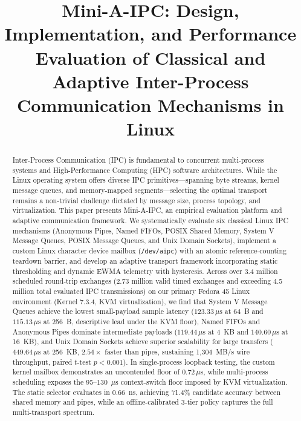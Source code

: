 \documentclass[conference]{IEEEtran}
\begin{document}
\title{Mini-A-IPC: Design, Implementation, and Performance Evaluation of Classical and Adaptive Inter-Process Communication Mechanisms in Linux}

\author{
}

\maketitle

\begin{abstract}
Inter-Process Communication (IPC) is fundamental to concurrent multi-process systems and High-Performance Computing (HPC) software architectures. While the Linux operating system offers diverse IPC primitives---spanning byte streams, kernel message queues, and memory-mapped segments---selecting the optimal transport remains a non-trivial challenge dictated by message size, process topology, and virtualization. This paper presents Mini-A-IPC, an empirical evaluation platform and adaptive communication framework. We systematically evaluate six classical Linux IPC mechanisms (Anonymous Pipes, Named FIFOs, POSIX Shared Memory, System V Message Queues, POSIX Message Queues, and Unix Domain Sockets), implement a custom Linux character device mailbox (\texttt{/dev/aipc}) with an atomic reference-counting teardown barrier, and develop an adaptive transport framework incorporating static thresholding and dynamic EWMA telemetry with hysteresis. Across over 3.4 million scheduled round-trip exchanges (2.73 million valid timed exchanges and exceeding 4.5 million total evaluated IPC transmissions) on our primary Fedora 45 Linux environment (Kernel 7.3.4, KVM virtualization), we find that System V Message Queues achieve the lowest small-payload sample latency ($123.33\,\mu\text{s}$ at 64~B and $115.13\,\mu\text{s}$ at 256~B, descriptive lead under the KVM floor), Named FIFOs and Anonymous Pipes dominate intermediate payloads ($119.44\,\mu\text{s}$ at 4~KB and $140.60\,\mu\text{s}$ at 16~KB), and Unix Domain Sockets achieve superior scalability for large transfers ($449.64\,\mu\text{s}$ at 256~KB, $2.54\times$ faster than pipes, sustaining 1,304~MB/s wire throughput, paired $t$-test $p < 0.001$). In single-process loopback testing, the custom kernel mailbox demonstrates an uncontended floor of $0.72\,\mu\text{s}$, while multi-process scheduling exposes the 95--130~$\mu\text{s}$ context-switch floor imposed by KVM virtualization. The static selector evaluates in 0.66~ns, achieving 71.4\% candidate accuracy between shared memory and pipes, while an offline-calibrated 3-tier policy captures the full multi-transport spectrum.
\end{abstract}
\end{document}
